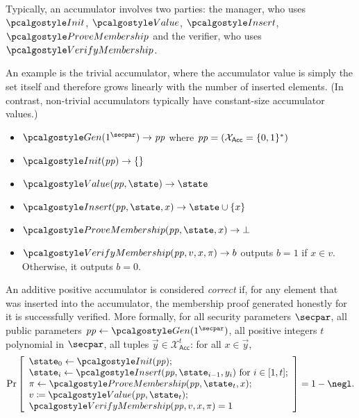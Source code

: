 Typically, an accumulator involves two parties: the manager, who uses $\algo{Init}$, $\algo{Value}$, $\algo{Insert}$, $\algo{ProveMembership}$ and the verifier, who uses $\algo{VerifyMembership}$.

\begin{example}
  An example is the trivial accumulator\label{sec:trivial-acc}, where the accumulator value is simply the set itself and therefore grows linearly with the number of inserted elements.
  (In contrast, non-trivial accumulators typically have constant-size accumulator values.)
  \begin{itemize}
    \item $\algo{Gen}(1^\secpar)\rightarrow \params$ where $\mathit{pp} = (\mathcal{X}_\mathsf{Acc} = \{0,1\}^*)$
    \item $\algo{Init}(\params)\rightarrow \{\}$
    \item $\algo{Value}(\params, \state)\rightarrow \state$
    \item $\algo{Insert}(\params, \state, x) \rightarrow \state \cup \{x\}$
    \item $\algo{ProveMembership}(\params, \state, x) \rightarrow \bot$
    \item $\algo{VerifyMembership}(\params, v, x, \pi) \rightarrow b$ outputs $b = 1$ if $x \in v$. Otherwise, it outputs $b = 0$.
  \end{itemize}
\end{example}

\begin{definition}[Correctness]
An additive positive accumulator is considered \emph{correct} if, for any element that was inserted into the accumulator, the membership proof generated honestly for it is successfully verified.
More formally, for all security parameters $\secpar$, all public parameters $\params \gets \algo{Gen}(1^\secpar)$, all positive integers $t$ polynomial in $\secpar$, all tuples $\vec{y} \in \mathcal{X}_\mathsf{Acc}^{t}$: for all $x \in \vec{y}$,
\[
    \Pr\left[
    \begin{array}{l}
        \state_0 \gets \algo{Init}(\params); \\
        \state_i \gets \algo{Insert}(\params, \state_{i - 1}, y_i) \text{ for } i \in [1, t]; \\
        \pi \gets \algo{ProveMembership}(\params, \state_t, x); \\
        v \defeq \algo{Value}(\params, \state_t); \\
        \algo{VerifyMembership}(\params, v, x, \pi) = 1
    \end{array}
    \right] = 1 - \negl.
\]
\end{definition}

